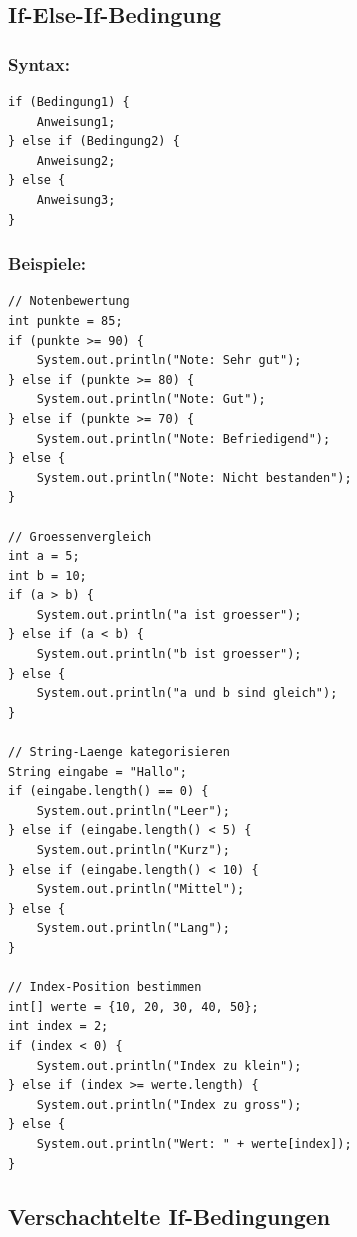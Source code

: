 \newpage


\subsection*{If-Else-If-Bedingung}

\subsubsection*{Syntax:}
\begin{lstlisting}
if (Bedingung1) {
    Anweisung1;
} else if (Bedingung2) {
    Anweisung2;
} else {
    Anweisung3;
}
\end{lstlisting}

\subsubsection*{Beispiele:}
\begin{lstlisting}
// Notenbewertung
int punkte = 85;
if (punkte >= 90) {
    System.out.println("Note: Sehr gut");
} else if (punkte >= 80) {
    System.out.println("Note: Gut");
} else if (punkte >= 70) {
    System.out.println("Note: Befriedigend");
} else {
    System.out.println("Note: Nicht bestanden");
}

// Groessenvergleich
int a = 5;
int b = 10;
if (a > b) {
    System.out.println("a ist groesser");
} else if (a < b) {
    System.out.println("b ist groesser");
} else {
    System.out.println("a und b sind gleich");
}

// String-Laenge kategorisieren
String eingabe = "Hallo";
if (eingabe.length() == 0) {
    System.out.println("Leer");
} else if (eingabe.length() < 5) {
    System.out.println("Kurz");
} else if (eingabe.length() < 10) {
    System.out.println("Mittel");
} else {
    System.out.println("Lang");
}

// Index-Position bestimmen
int[] werte = {10, 20, 30, 40, 50};
int index = 2;
if (index < 0) {
    System.out.println("Index zu klein");
} else if (index >= werte.length) {
    System.out.println("Index zu gross");
} else {
    System.out.println("Wert: " + werte[index]);
}
\end{lstlisting}

\newpage


\subsection*{Verschachtelte If-Bedingungen}

